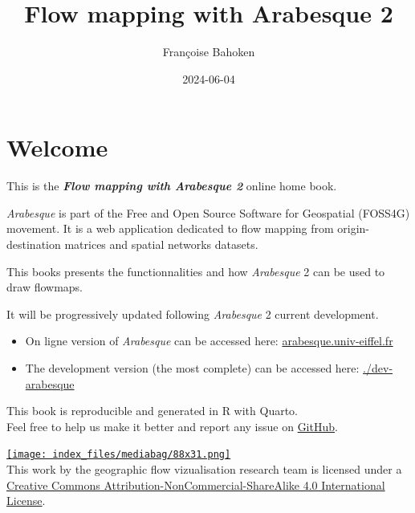 \documentclass[
  letterpaper,
  DIV=11,
  numbers=noendperiod]{scrreprt}
\title{Flow mapping with Arabesque 2}
\author{Françoise Bahoken}
\date{2024-06-04}
\providecommand{\tightlist}{%
  \setlength{\itemsep}{0pt}\setlength{\parskip}{0pt}}\usepackage{longtable,booktabs,array}
\renewcommand*\contentsname{Table of contents}
\newcommand\contentsname{Table of contents}
\begin{document}
\maketitle

\renewcommand*\contentsname{Table of contents}
{
\hypersetup{linkcolor=}
\setcounter{tocdepth}{2}
\tableofcontents
}

\chapter*{Welcome}\label{welcome}


This is the \textbf{\emph{Flow mapping with Arabesque 2}} online home
book.

\emph{Arabesque} is part of the Free and Open Source Software for
Geospatial (FOSS4G) movement. It is a web application dedicated to flow
mapping from origin-destination matrices and spatial networks datasets.

This books presents the functionnalities and how \emph{Arabesque} 2 can
be used to draw flowmaps.

It will be progressively updated following \emph{Arabesque} 2 current
development.

\begin{itemize}
\tightlist
\item
  On ligne version of \emph{Arabesque} can be accessed here:
  \href{https://arabesque.univ-eiffel.fr/}{arabesque.univ-eiffel.fr}
\end{itemize}

\begin{itemize}
\tightlist
\item
  The development version (the most complete) can be accessed here:
  \href{https://tonhauck.github.io/dev-arabesque/}{./dev-arabesque}
\end{itemize}

This book is reproducible and generated in R with Quarto.\\
Feel free to help us make it better and report any issue on
\href{https://github.com/gflowiz/arabesque}{GitHub}.

\href{http://creativecommons.org/licenses/by-nc-sa/4.0/}{\texttt{[image: index\_files/mediabag/88x31.png]}}\\
This work by the geographic flow vizualisation research team is licensed
under a
\href{http://creativecommons.org/licenses/by-nc-sa/4.0/}{Creative
Commons Attribution-NonCommercial-ShareAlike 4.0 International License}.
\end{document}
